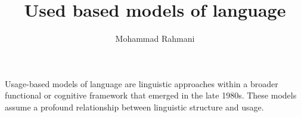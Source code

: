 \documentclass[a4paper]{article}
\title{Used based models of language}
\date{}
\author{Mohammad Rahmani}
\begin{document}
\maketitle
    Usage-based models of language are linguistic approaches within a broader functional or cognitive framework that emerged in the late 1980s. These models assume a profound relationship between linguistic structure and usage. 
    
    
\end{document}
